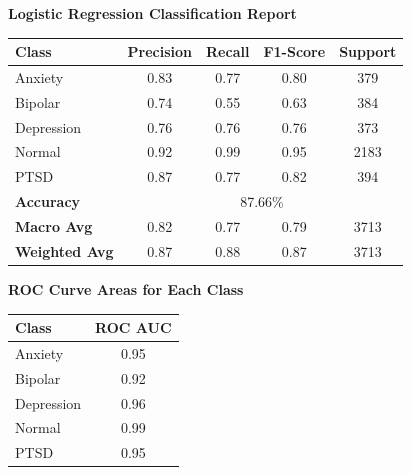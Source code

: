 \begin{center}
    \textbf{Logistic Regression Classification Report} \\[0.5em]
    \begin{tabular}{|l|c|c|c|c|}
        \hline
        \textbf{Class} & \textbf{Precision} & \textbf{Recall} & \textbf{F1-Score} & \textbf{Support} \\ \hline
        Anxiety        & 0.83               & 0.77            & 0.80              & 379              \\ \hline
        Bipolar        & 0.74               & 0.55            & 0.63              & 384              \\ \hline
        Depression     & 0.76               & 0.76            & 0.76              & 373              \\ \hline
        Normal         & 0.92               & 0.99            & 0.95              & 2183             \\ \hline
        PTSD           & 0.87               & 0.77            & 0.82              & 394              \\ \hline
        \textbf{Accuracy} & \multicolumn{4}{|c|}{87.66\%} \\ \hline
        \textbf{Macro Avg} & 0.82            & 0.77            & 0.79              & 3713             \\ \hline
        \textbf{Weighted Avg} & 0.87         & 0.88            & 0.87              & 3713             \\ \hline
    \end{tabular}
\end{center}

\vspace{0.25em}

\begin{center}
    \textbf{ROC Curve Areas for Each Class} \\[0.5em]
    \begin{tabular}{|l|c|}
        \hline
        \textbf{Class}  & \textbf{ROC AUC} \\ \hline
        Anxiety         & 0.95            \\ \hline
        Bipolar         & 0.92            \\ \hline
        Depression      & 0.96            \\ \hline
        Normal          & 0.99            \\ \hline
        PTSD            & 0.95            \\ \hline
    \end{tabular}
\end{center}

